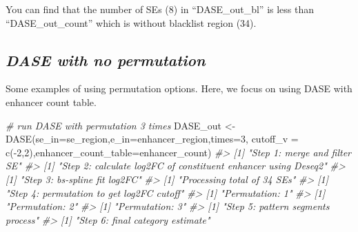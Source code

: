 \documentclass[
]{article}
\newenvironment{Shaded}{\begin{snugshade}}{\end{snugshade}}
\newcommand{\AttributeTok}[1]{\textcolor[rgb]{0.77,0.63,0.00}{#1}}
\newcommand{\CommentTok}[1]{\textcolor[rgb]{0.56,0.35,0.01}{\textit{#1}}}
\newcommand{\DecValTok}[1]{\textcolor[rgb]{0.00,0.00,0.81}{#1}}
\newcommand{\FunctionTok}[1]{\textcolor[rgb]{0.00,0.00,0.00}{#1}}
\newcommand{\NormalTok}[1]{#1}
\newcommand{\OtherTok}[1]{\textcolor[rgb]{0.56,0.35,0.01}{#1}}
\newcommand{\SpecialCharTok}[1]{\textcolor[rgb]{0.00,0.00,0.00}{#1}}
\begin{document}
You can find that the number of SEs (8) in ``DASE\_out\_bl'' is less
than ``DASE\_out\_count'' which is without blacklist region (34).

\hypertarget{dase-with-no-permutation}{%
\subsection{\texorpdfstring{\emph{DASE with no
permutation}}{DASE with no permutation}}\label{dase-with-no-permutation}}

Some examples of using permutation options. Here, we focus on using DASE
with enhancer count table.

\begin{Shaded}
\begin{Highlighting}[]
\CommentTok{\# run DASE with permutation 3 times}
\NormalTok{DASE\_out }\OtherTok{\textless{}{-}} \FunctionTok{DASE}\NormalTok{(}\AttributeTok{se\_in=}\NormalTok{se\_region,}\AttributeTok{e\_in=}\NormalTok{enhancer\_region,}\AttributeTok{times=}\DecValTok{3}\NormalTok{,}
                 \AttributeTok{cutoff\_v =} \FunctionTok{c}\NormalTok{(}\SpecialCharTok{{-}}\DecValTok{2}\NormalTok{,}\DecValTok{2}\NormalTok{),}\AttributeTok{enhancer\_count\_table=}\NormalTok{enhancer\_count)}
\CommentTok{\#\textgreater{} [1] "Step 1: merge and filter SE"}
\CommentTok{\#\textgreater{} [1] "Step 2: calculate log2FC of constituent enhancer using Deseq2"}
\CommentTok{\#\textgreater{} [1] "Step 3: bs{-}spline fit log2FC"}
\CommentTok{\#\textgreater{} [1] "Processing total of 34 SEs"}
\CommentTok{\#\textgreater{} [1] "Step 4: permutation to get log2FC cutoff"}
\CommentTok{\#\textgreater{} [1] "Permutation: 1"}
\CommentTok{\#\textgreater{} [1] "Permutation: 2"}
\CommentTok{\#\textgreater{} [1] "Permutation: 3"}
\CommentTok{\#\textgreater{} [1] "Step 5: pattern segments process"}
\CommentTok{\#\textgreater{} [1] "Step 6: final category estimate"}
\end{Highlighting}
\end{Shaded}
\end{document}
